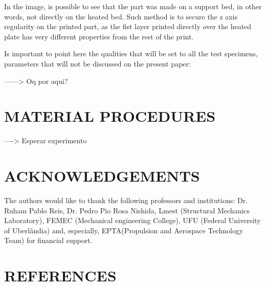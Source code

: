 \documentclass[10pt,fleqn,a4paper,twoside]{article}
\begin{document}
In the image, is possible to see that the part was made on a support bed, in other words, not directly on the heated bed. Such method is to secure the z axis regularity on the printed part, as the fist layer printed directly over the heated plate has very different properties from the rest of the print. 

Is important to point here the qualities that will be set to all the test specimens, parameters that will not be discussed on the present paper:


------> Oq por aqui?






%






\section{MATERIAL PROCEDURES}




----> Esperar experimento





\section{ACKNOWLEDGEMENTS}
The authors would like to thank the following professors and institutions: Dr. Ruham Pablo Reis, Dr. Pedro Pio Rosa Nishida, Lmest (Structural Mechanics Laboratory), FEMEC (Mechanical engineering College), UFU (Federal University of Uberl\^andia) and, especially, EPTA(Propulsion and Aerospace Technology Team) for financial support.




\section{REFERENCES} 


\renewcommand{\refname}{}

\end{document}
